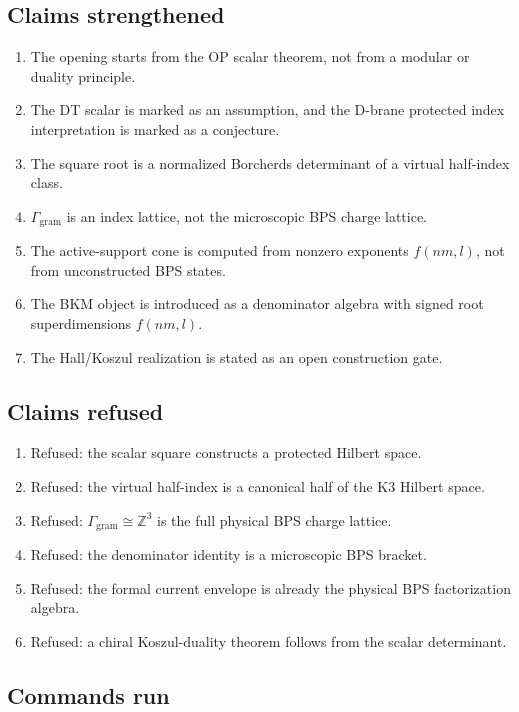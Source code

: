 \subsection{Claims strengthened}

\begin{enumerate}
\item The opening starts from the OP scalar theorem, not from a modular
or duality principle.
\item The DT scalar is marked as an assumption, and the D-brane protected
index interpretation is marked as a conjecture.
\item The square root is a normalized Borcherds determinant of a virtual
half-index class.
\item \(\Gamma_{\mathrm{gram}}\) is an index lattice, not the microscopic
BPS charge lattice.
\item The active-support cone is computed from nonzero exponents
\(f(nm,l)\), not from unconstructed BPS states.
\item The BKM object is introduced as a denominator algebra with signed
root superdimensions \(f(nm,l)\).
\item The Hall/Koszul realization is stated as an open construction gate.
\end{enumerate}

\subsection{Claims refused}

\begin{enumerate}
\item Refused: the scalar square constructs a protected Hilbert space.
\item Refused: the virtual half-index is a canonical half of the K3
Hilbert space.
\item Refused: \(\Gamma_{\mathrm{gram}}\cong\mathbb Z^3\) is the full
physical BPS charge lattice.
\item Refused: the denominator identity is a microscopic BPS bracket.
\item Refused: the formal current envelope is already the physical BPS
factorization algebra.
\item Refused: a chiral Koszul-duality theorem follows from the scalar
determinant.
\end{enumerate}

\subsection{Commands run}

